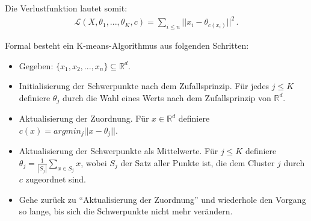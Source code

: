Die Verlustfunktion lautet somit:
\begin{align}
\mathcal{L} (X, \theta_1, ..., \theta_K, c) = \sum_{i \leq n} || x_i - \theta_{c(x_i)}||^2\,.
\label{eq:vl13-1}
\end{align}


Formal besteht ein K-means-Algorithmus aus folgenden Schritten:
\begin{itemize}
    \setlength\itemsep{0em}
        \item Gegeben: $\{ x_1, x_2, ..., x_n\} \subseteq \mathbb{R}^d$.
        \item Initialisierung der Schwerpunkte nach dem Zufallsprinzip. F\"ur jedes $j \leq K$ definiere $\theta_j$ durch die Wahl eines Werts nach dem Zufallsprinzip von $\mathbb{R}^d$.
        \item Aktualisierung der Zuordnung. F\"ur $x \in \mathbb{R}^d$ definiere $c(x) = argmin_j ||x-\theta_j||$.
        \item Aktualisierung der Schwerpunkte als Mittelwerte. F\"ur $j \leq K$ definiere $\theta_j = \frac{1}{|S_j|} \sum_{x \in S_j} x$, wobei $S_j$ der Satz aller Punkte ist, die dem Cluster $j$ durch $c$ zugeordnet sind.
        \item Gehe zur\"uck zu ``Aktualisierung der Zuordnung'' und wiederhole den Vorgang so lange, bis sich die Schwerpunkte nicht mehr ver\"andern.
\end{itemize}

